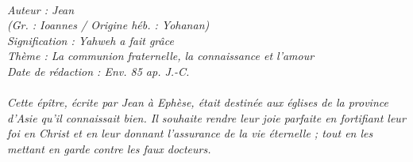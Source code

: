 \BFont
\noindent\hrulefill
{\footnotesize
\textit{
\bigskip
{\centering{}
\\Auteur : Jean
\\(Gr. : Ioannes / Origine héb. : Yohanan)
\\Signification : Yahweh a fait grâce
\\Thème : La communion fraternelle, la connaissance et l'amour
\\Date de rédaction : Env. 85 ap. J.-C.\\}
}
\textit{
\\Cette épître, écrite par Jean à Ephèse, était destinée aux églises de la province d'Asie qu'il connaissait bien. Il souhaite rendre leur joie parfaite en fortifiant leur foi en Christ et en leur donnant l'assurance de la vie éternelle ; tout en les mettant en garde contre les faux docteurs.\bigskip
}
}
\par\nobreak\noindent\hrulefill
